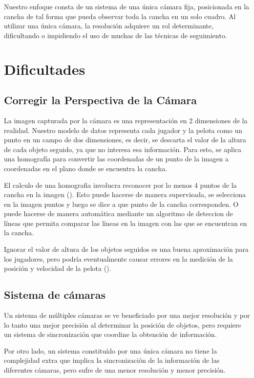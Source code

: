 Nuestro enfoque consta de un sistema de una única cámara fija, posicionada en
la cancha de tal forma que pueda observar toda la cancha en un solo cuadro. Al
utilizar una única cámara, la resolución adquiere un rol determinante,
dificultando o impidiendo el uso de muchas de las técnicas de seguimiento.

\section{Dificultades}

\subsection{Corregir la Perspectiva de la Cámara}

La imagen capturada por la cámara es una representación en 2 dimensiones de
la realidad. Nuestro modelo de datos representa cada jugador y la pelota
como un punto en un campo de dos dimensiones, es decir, se descarta el valor
de la altura de cada objeto seguido, ya que no interesa esa información.
Para esto, se aplica una homografía para convertir las coordenadas de un punto de
la imagen a coordenadas en el plano donde se encuentra la cancha.

El calculo de una homografia involucra reconocer por lo menos 4 puntos de la cancha
en la imagen (\cite{homography-estimation}). Esto puede hacerse de manera supervisada, se selecciona en la imagen
puntos y luego se dice a que punto de la cancha corresponden. O puede hacerse de
manera automática mediante un algoritmo de deteccion de líneas que permita
comparar las líneas en la imagen con las que se encuentran en la cancha.

Ignorar el valor de altura de los objetos seguidos es una buena aproximación
para los jugadores, pero podría eventualmente causar errores en la medición de
la posición y velocidad de la pelota (\cite{Liu20061146}).

\subsection{Sistema de cámaras}
\label{sub-sec:camaras}

Un sistema de múltiples cámaras se ve beneficiado por una mejor resolución y
por lo tanto una mejor precisión al determinar la posición de objetos, pero
requiere un sistema de sincronización que coordine la obtención de información.

Por otro lado, un sistema constituído por una única cámara no tiene la
complejidad extra que implica la sincronización de la información de las
diferentes cámaras, pero sufre de una menor resolución y menor precisión.

